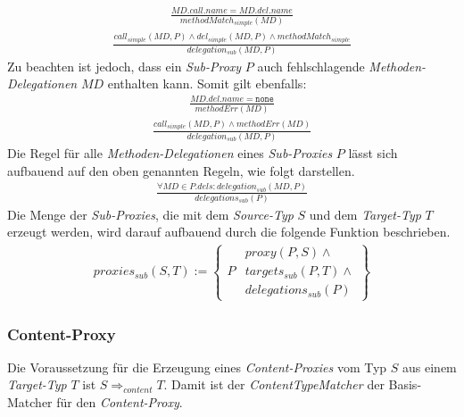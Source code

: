 \begin{gather*}
\frac{\mathit{MD.call.name} = \mathit{MD.del.name}}
{\mathit{methodMatch_{simple}(MD)}}
\end{gather*}
\begin{gather*}
\frac{\mathit{call_{simple}(MD, P)} \wedge \mathit{del_{simple}(MD, P)} \wedge \mathit{methodMatch_{simple}}}
{\mathit{delegation_{sub}(MD, P)}}
\end{gather*}
\noindent
Zu beachten ist jedoch, dass ein \emph{Sub-Proxy} $P$ auch fehlschlagende \emph{Methoden-Delegationen} $\mathit{MD}$ enthalten kann. Somit gilt ebenfalls:
\begin{gather*}
\frac{ \mathit{MD.del.name} = \texttt{none}}
{\mathit{methodErr(MD)}}
\end{gather*}
\begin{gather*}
\frac{\mathit{call_{simple}(MD, P)} \wedge \mathit{methodErr(MD)}}
{\mathit{delegation_{sub}(MD, P)}}
\end{gather*}
\noindent
Die Regel für alle \emph{Methoden-Delegationen} eines \emph{Sub-Proxies} $P$ lässt sich aufbauend auf den oben genannten Regeln, wie folgt darstellen.
\begin{gather*}
\frac{\forall \mathit{MD} \in P.dels: \mathit{delegation_{sub}(MD,P)}}
{\mathit{delegations_{sub}(P)}}
\end{gather*}
\noindent
Die Menge der \emph{Sub-Proxies}, die mit dem \emph{Source-Typ} $S$ und dem \emph{Target-Typ} $T$ erzeugt werden, wird darauf aufbauend durch die folgende Funktion beschrieben.
\begin{gather*}
\mathit{proxies_{sub}(S,T)} := 
\left\{\begin{array}{l|l}
		& \mathit{proxy(P,S)}\wedge \mathit{ } \\
	P	& \mathit{targets_{sub}(P,T)} \wedge \mathit{ } \\
		& \mathit{delegations_{sub}(P)}
		 \end{array}
\right\}
\end{gather*}
\subsubsection{Content-Proxy}
Die Voraussetzung für die Erzeugung eines \emph{Content-Proxies} vom Typ $S$ aus einem \emph{Target-Typ} $T$ ist $S \Rightarrow_{content} T$. Damit ist der \emph{ContentTypeMatcher} der Basis-Matcher für den \emph{Content-Proxy}.

